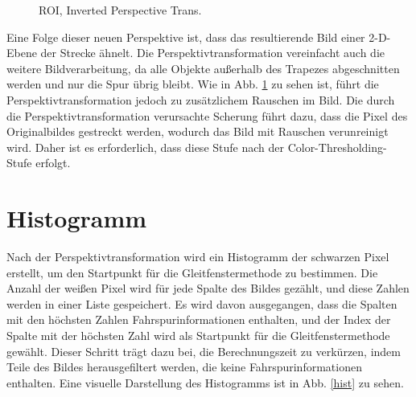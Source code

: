 \documentclass[arbeit=studie,oneside,BCOR=12mm]{ArbeitRST}
\begin{document}
\begin{figure}[h]
    \centering
    \caption{ROI, Inverted Perspective Trans.}
    \label{roi-pt}
\end{figure}

Eine Folge dieser neuen Perspektive ist, dass das resultierende Bild einer
2-D-Ebene der Strecke ähnelt. Die Perspektivtransformation vereinfacht auch die
weitere Bildverarbeitung, da alle Objekte außerhalb des Trapezes abgeschnitten
werden und nur die Spur übrig bleibt. Wie in Abb. \ref{roi-pt} zu sehen ist, führt die
Perspektivtransformation jedoch zu zusätzlichem Rauschen im Bild. Die durch die
Perspektivtransformation verursachte Scherung führt dazu, dass die Pixel des
Originalbildes gestreckt werden, wodurch das Bild mit Rauschen verunreinigt
wird. Daher ist es erforderlich, dass diese Stufe nach der
\glqq Color-Thresholding\grqq-Stufe erfolgt.

\section{Histogramm}

Nach der Perspektivtransformation wird ein Histogramm der schwarzen Pixel erstellt,
um den Startpunkt für die Gleitfenstermethode zu bestimmen. Die Anzahl der
weißen Pixel wird für jede Spalte des Bildes gezählt, und diese Zahlen werden
in einer Liste gespeichert. Es wird davon ausgegangen, dass die Spalten mit den
höchsten Zahlen Fahrspurinformationen enthalten, und der Index der Spalte mit
der höchsten Zahl wird als Startpunkt für die Gleitfenstermethode gewählt.
Dieser Schritt trägt dazu bei, die Berechnungszeit zu verkürzen, indem Teile
des Bildes herausgefiltert werden, die keine Fahrspurinformationen enthalten.
Eine visuelle Darstellung des Histogramms ist in Abb. \ref{hist} zu sehen. \\
\end{document}
